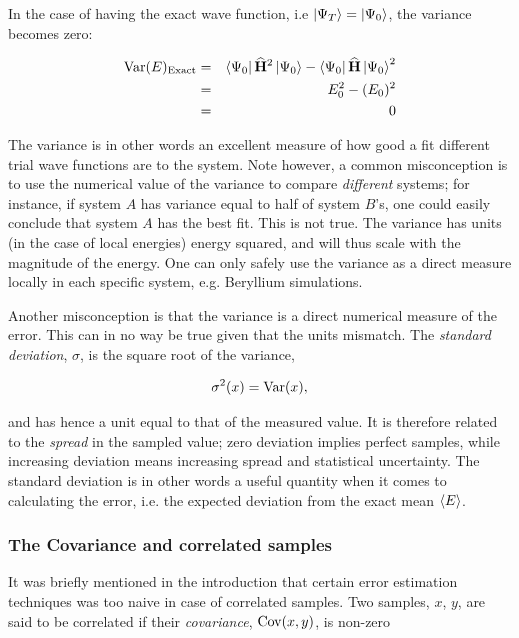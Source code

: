 In the case of having the exact wave function, i.e $\left| \Psi_T \right> = \left| \Psi_0 \right>$, the variance becomes zero:

\begin{eqnarray*}
\label{eq:varianceZeroExact}
\mathrm{Var}(E)_\mathrm{Exact} &=& \left< \Psi_0 \right|{\bf\widehat{H}}^2\left| \Psi_0 \right> -  \left< \Psi_0 \right|{\bf\widehat{H}}\left| \Psi_0 \right>^2 \\
		        &=& E_0^2 - (E_0)^2 \\
		        &=& 0
\end{eqnarray*}

The variance is in other words an excellent measure of how good a fit different trial wave functions are to the system. Note however, a common misconception is to use the numerical value of the variance to compare \textit{different} systems; for instance, if system $A$ has variance equal to half of system $B$'s, one could easily conclude that system $A$ has the best fit. This is not true. The variance has units (in the case of local energies) energy squared, and will thus scale with the magnitude of the energy. One can only safely use the variance as a direct measure locally in each specific system, e.g. Beryllium simulations.

Another misconception is that the variance is a direct numerical measure of the error. This can in no way be true given that the units mismatch. The \textit{standard deviation}, $\sigma$, is the square root of the variance,

\begin{equation}
\label{eq:stdNaive}
 \sigma^2(x) = \mathrm{Var}(x),
\end{equation}


and has hence a unit equal to that of the measured value. It is therefore related to the \textit{spread} in the sampled value; zero deviation implies perfect samples, while increasing deviation means increasing spread and statistical uncertainty. The standard deviation is in other words a useful quantity when it comes to calculating the error, i.e. the expected deviation from the exact mean $\left< E \right>$.

\subsubsection{The Covariance and correlated samples}

It was briefly mentioned in the introduction that certain error estimation techniques was too naive in case of correlated samples. Two samples, $x$, $y$, are said to be correlated if their \textit{covariance}, $\mathrm{Cov}(x, y)$, is non-zero

